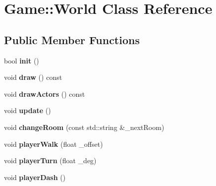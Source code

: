 \hypertarget{classGame_1_1World}{\section{Game\-:\-:World Class Reference}
\label{classGame_1_1World}
}
\subsection*{Public Member Functions}
\begin{DoxyCompactItemize}
\item 
\hypertarget{classGame_1_1World_a5210effbf160fb0531b706c4292dda9c}{bool {\bfseries init} ()}\label{classGame_1_1World_a5210effbf160fb0531b706c4292dda9c}

\item 
\hypertarget{classGame_1_1World_a78c7be887b292218049c6c4711712438}{void {\bfseries draw} () const }\label{classGame_1_1World_a78c7be887b292218049c6c4711712438}

\item 
\hypertarget{classGame_1_1World_a893a6ff86f81183825333505f1739001}{void {\bfseries draw\-Actors} () const }\label{classGame_1_1World_a893a6ff86f81183825333505f1739001}

\item 
\hypertarget{classGame_1_1World_a5c787886c39d4398856ee9c880961cff}{void {\bfseries update} ()}\label{classGame_1_1World_a5c787886c39d4398856ee9c880961cff}

\item 
\hypertarget{classGame_1_1World_a6986a87b6a08f3cfb7cc5f018f7cf134}{void {\bfseries change\-Room} (const std\-::string \&\-\_\-next\-Room)}\label{classGame_1_1World_a6986a87b6a08f3cfb7cc5f018f7cf134}

\item 
\hypertarget{classGame_1_1World_a56892aa3cae6992335ead8572d8bb8be}{void {\bfseries player\-Walk} (float \-\_\-offset)}\label{classGame_1_1World_a56892aa3cae6992335ead8572d8bb8be}

\item 
\hypertarget{classGame_1_1World_aa8f08737beaf45ece98fbdfb8b136e29}{void {\bfseries player\-Turn} (float \-\_\-deg)}\label{classGame_1_1World_aa8f08737beaf45ece98fbdfb8b136e29}

\item 
\hypertarget{classGame_1_1World_abc5310d2b97c22e4561911e8f33ca9ed}{void {\bfseries player\-Dash} ()}\label{classGame_1_1World_abc5310d2b97c22e4561911e8f33ca9ed}


\end{DoxyCompactItemize}
